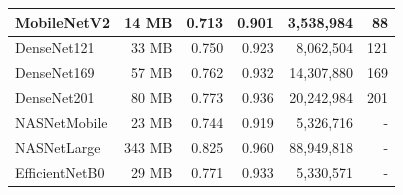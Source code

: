 \begin{table}[h!]
\begin{tabular}{|l|r|r|r|r|r|}
    MobileNetV2                                                  & 14 MB                              & 0.713                                                                                   & 0.901                                                                                   & 3,538,984                                & 88                                  \\ \hline
    DenseNet121                                                  & 33 MB                              & 0.750                                                                                   & 0.923                                                                                   & 8,062,504                                & 121                                 \\ \hline
    DenseNet169                                                  & 57 MB                              & 0.762                                                                                   & 0.932                                                                                   & 14,307,880                               & 169                                 \\ \hline
    DenseNet201                                                  & 80 MB                              & 0.773                                                                                   & 0.936                                                                                   & 20,242,984                               & 201                                 \\ \hline
    NASNetMobile                                                 & 23 MB                              & 0.744                                                                                   & 0.919                                                                                   & 5,326,716                                & -                                   \\ \hline
    NASNetLarge                                                  & 343 MB                             & 0.825                                                                                   & 0.960                                                                                   & 88,949,818                               & -                                   \\ \hline
    EfficientNetB0                                               & 29 MB                              & 0.771                                                                                   & 0.933                                                                                   & 5,330,571                                & -                                   \\ \hline

\end{tabular}
\end{table}
